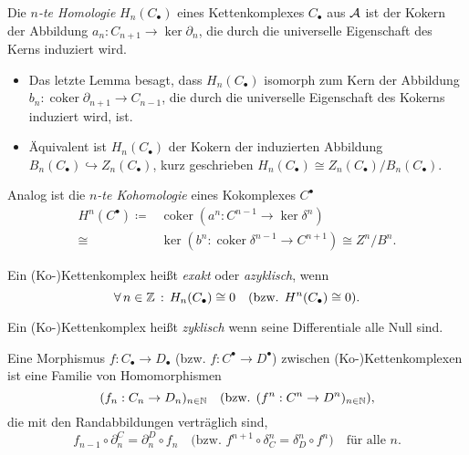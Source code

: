 \documentclass{cheat-sheet}
\newcommand{\CC}[1]{{#1}_{\bullet}} %
\newcommand{\CCC}[1]{{#1}^{\bullet}} %
\DeclareMathOperator{\coker}{coker} %
\begin{document}
\begin{defn}
  Die \emph{$n$-te Homologie} $H_n(\CC{C})$ eines Kettenkomplexes $\CC{C}$ aus $\mathcal{A}$ ist der Kokern der Abbildung $a_n : C_{n+1} \to \ker \partial_n$, die durch die universelle Eigenschaft des Kerns induziert wird. \\
\end{defn}

\begin{bem}
  \begin{itemize}
    \item Das letzte Lemma besagt, dass $H_n(\CC{C})$ isomorph zum Kern der Abbildung $b_n : \coker \partial_{n+1} \to C_{n-1}$, die durch die universelle Eigenschaft des Kokerns induziert wird, ist.
    \item Äquivalent ist $H_n(\CC{C})$ der Kokern der induzierten Abbildung $B_n(\CC{C}) \hookrightarrow Z_n(\CC{C})$, kurz geschrieben $H_n(\CC{C}) \cong Z_n(\CC{C}) / B_n(\CC{C})$.
  \end{itemize}
\end{bem}

\begin{defn}
  Analog ist die \emph{$n$-te Kohomologie} eines Kokomplexes $\CCC{C}$
  \begin{align*}
  H^n(\CCC{C}) \coloneqq & \coker (a^n : C^{n-1} \to \ker \delta^n) \\
  \cong & \ker (b^n : \coker \delta^{n-1} \to C^{n+1}) \cong Z^n / B^n.
  \end{align*}
\end{defn}

\begin{defn}
  Ein (Ko-)Kettenkomplex heißt \emph{exakt} oder \emph{azyklisch}, wenn
  \[
    \fa{n \in \Z} H_n(\CC{C}) \cong 0 \quad
    (\text{bzw. } H^n(\CC{C}) \cong 0).
  \]
\end{defn}

\begin{defn}
  Ein (Ko-)Kettenkomplex heißt \emph{zyklisch} wenn seine Differentiale alle Null sind.
\end{defn}

\begin{defn}
  Eine Morphismus $f : \CC{C} \to \CC{D}$ (bzw. $f : \CCC{C} \to \CCC{D}$) zwischen (Ko-)Kettenkomplexen ist eine Familie von Homomorphismen
  \[
    (f_n : C_n \to D_n)_{n \in \mathbb{N}} \quad
    \text{(bzw. $(f^n : C^n \to D^n)_{n \in \mathbb{N}}$),}
  \]
  die mit den Randabbildungen verträglich sind, \dh{}
  \[
    f_{n-1} \circ \partial^C_n = \partial^D_n \circ f_n \quad
    \text{(bzw. $f^{n+1} \circ \delta_C^n = \delta_D^n \circ f^n$)} \quad
    \text{für alle $n$.}
  \]
\end{defn}
\end{document}
